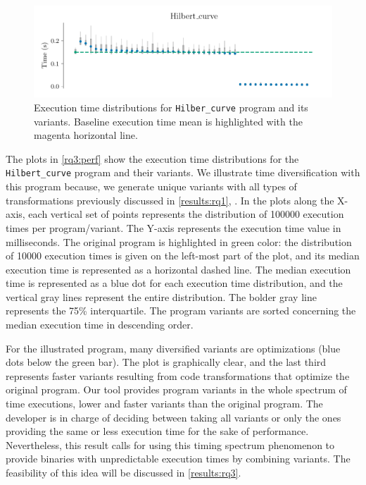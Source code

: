 \begin{figure}[h]
    \centering
    \includegraphics[width=\linewidth]{plots/hilbert_curve.pdf}
    \caption{Execution time distributions for \texttt{Hilber\_curve} program and its variants. Baseline execution time mean is highlighted with the magenta horizontal line. }
    \label{rq3:perf}
\end{figure}

The plots in \autoref{rq3:perf} show the execution time distributions for the \texttt{Hilbert\_curve} program and their variants. 
We illustrate time diversification with this program because, we generate unique variants with all types of transformations previously discussed in \autoref{results:rq1}, .
In the plots along the X-axis, each vertical set of points represents the distribution of 100000 execution times per program/variant. The Y-axis represents the execution time value in milliseconds. The original program is highlighted in green color: the distribution of 10000 execution times is given on the left-most part of the plot, and its median execution time is represented as a horizontal dashed line. The median execution time is represented as a blue dot for each execution time distribution, and the vertical gray lines represent the entire distribution. The bolder gray line represents the 75\% interquartile. The program variants are sorted concerning the median execution time in descending order.

For the illustrated program, many diversified variants are optimizations (blue dots below the green bar). The plot is graphically clear, and the last third represents faster variants resulting from code transformations that optimize the original program.
Our tool provides program variants in the whole spectrum of time executions, lower and faster variants than the original program. The developer is in charge of deciding between taking all variants or only the ones providing the same or less execution time for the sake of performance. Nevertheless, this result calls for using this timing spectrum phenomenon to provide binaries with unpredictable execution times by combining variants. The feasibility of this idea will be discussed in \autoref{results:rq3}.

